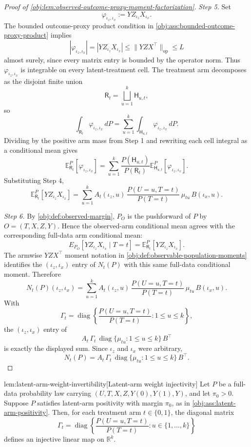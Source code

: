 \documentclass[11pt]{article}
\begin{document}
\begin{proof}[Proof of \cref{obj:lem:observed-outcome-proxy-moment-factorization}]
\emph{Step 5.} Set
\[
\varphi_{\iota_z,\iota_x}:=YZ_{\iota_z}X_{\iota_x}.
\]
The bounded outcome-proxy product condition in \cref{obj:ass:bounded-outcome-proxy-product} implies
\[
|\varphi_{\iota_z,\iota_x}|
=
|YZ_{\iota_z}X_{\iota_x}|
\le
\|YZX^\top\|_{\mathrm{op}}
\le L
\]
almost surely, since every matrix entry is bounded by the operator norm.  Thus \(\varphi_{\iota_z,\iota_x}\) is integrable on every latent-treatment cell.  The treatment arm decomposes as the disjoint finite union
\[
\mathsf R_t=\bigsqcup_{u=1}^{k}\mathsf H_{u,t},
\]
so
\[
\int_{\mathsf R_t}\varphi_{\iota_z,\iota_x}\,dP
=
\sum_{u=1}^{k}\int_{\mathsf H_{u,t}}\varphi_{\iota_z,\iota_x}\,dP .
\]
Dividing by the positive arm mass from Step 1 and rewriting each cell integral as a conditional mean gives
\[
\mathbb E_{\mathsf R_t}^{P}[\varphi_{\iota_z,\iota_x}]
=
\sum_{u=1}^{k}
\frac{P(\mathsf H_{u,t})}{P(\mathsf R_t)}
\mathbb E_{\mathsf H_{u,t}}^{P}[\varphi_{\iota_z,\iota_x}].
\]
Substituting Step 4,
\[
\mathbb E_{\mathsf R_t}^{P}[YZ_{\iota_z}X_{\iota_x}]
=
\sum_{u=1}^{k}
A_t(\iota_z,u)\,
\frac{P(U=u,T=t)}{P(T=t)}\,
\mu_{tu}\,
B(\iota_x,u).
\]

\emph{Step 6.} By \cref{obj:def:observed-margin}, \(P_O\) is the pushforward of \(P\) by \(O=(T,X,Z,Y)\).  Hence the observed-arm conditional mean agrees with the corresponding full-data arm conditional mean:
\[
E_{P_O}\!\left[YZ_{\iota_z}X_{\iota_x}\mid T=t\right]
=
\mathbb E_{\mathsf R_t}^{P}[YZ_{\iota_z}X_{\iota_x}].
\]
The armwise \(YZX^\top\) moment notation in \cref{obj:def:observable-population-moments} identifies the \((\iota_z,\iota_x)\) entry of \(N_t(P)\) with this same full-data conditional moment.  Therefore
\[
N_t(P)(\iota_z,\iota_x)
=
\sum_{u=1}^{k}
A_t(\iota_z,u)\,
\frac{P(U=u,T=t)}{P(T=t)}\,
\mu_{tu}\,
B(\iota_x,u).
\]
With
\[
\Gamma_t
=
\operatorname{diag}\left\{
\frac{P(U=u,T=t)}{P(T=t)}:1\le u\le k
\right\},
\]
the \((\iota_z,\iota_x)\) entry of
\[
A_t\,\Gamma_t\,\operatorname{diag}\{\mu_{tu}:1\le u\le k\}\,B^\top
\]
is exactly the displayed sum.  Since \(\iota_z\) and \(\iota_x\) were arbitrary,
\[
N_t(P)
=
A_t\,\Gamma_t\,\operatorname{diag}\{\mu_{tu}:1\le u\le k\}\,B^\top .
\]
\end{proof}

\begin{lemmav}{lem:latent-arm-weight-invertibility}[Latent-arm weight injectivity]
Let \(P\) be a full-data probability law carrying \((U,T,X,Z,Y(0),Y(1),Y)\), and let \(\pi_0>0\). Suppose \(P\) satisfies latent-arm positivity with margin \(\pi_0\), as in \cref{obj:ass:latent-arm-positivity}. Then, for each treatment arm \(t\in\{0,1\}\), the diagonal matrix
\[
\Gamma_t
=
\operatorname{diag}\left\{
\frac{P(U=u,T=t)}{P(T=t)}
: u\in\{1,\ldots,k\}
\right\}
\]
defines an injective linear map on \(\mathbb R^k\).
\end{lemmav}
\end{document}
